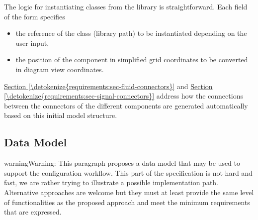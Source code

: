 \documentclass[letterpaper,10pt, openany,english]{sphinxmanual}
\begin{document}
The logic for instantiating classes from the library is straightforward. Each field of the form specifies
\begin{itemize}
\item {} 
the reference of the class (library path) to be instantiated depending on the user input,

\item {} 
the position of the component in simplified grid coordinates to be converted in diagram view coordinates.

\end{itemize}

\hyperref[\detokenize{requirements:sec-fluid-connectors}]{Section \ref{\detokenize{requirements:sec-fluid-connectors}}} and \hyperref[\detokenize{requirements:sec-signal-connectors}]{Section \ref{\detokenize{requirements:sec-signal-connectors}}} address how the connections between the connectors of the different components are generated automatically based on this initial model structure.


\subsection{Data Model}
\label{\detokenize{requirements:data-model}}\label{\detokenize{requirements:sec-data-model}}
\begin{sphinxadmonition}{warning}{Warning:}
This paragraph proposes a data model that may be used to support the configuration workflow. This part of the specification is not hard and fast, we are rather trying to illustrate a possible implementation path. Alternative approaches are welcome but they must at least provide the same level of functionalities as the proposed approach and meet the minimum requirements that are expressed.
\end{sphinxadmonition}
\end{document}
